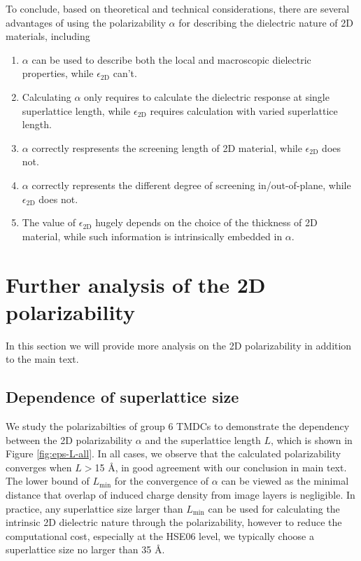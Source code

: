 \documentclass[manuscript=suppinfo,email=true,hyperref=true,keywords=false]{achemso}
\begin{document}
To conclude, based on theoretical and technical considerations, there are several
advantages of using the polarizability $\alpha$ for describing the dielectric
nature of 2D materials, including
\begin{enumerate}
\item $\alpha$ can be used to describe both the local and macroscopic dielectric properties, while $\epsilon_{\mathrm{2D}}$ can't.
\item Calculating $\alpha$ only requires to calculate the dielectric response at single superlattice length, while $\epsilon_{\mathrm{2D}}$ requires calculation with varied superlattice length.
\item $\alpha$ correctly respresents the screening length of 2D material, while $\epsilon_{\mathrm{2D}}$ does not.
\item $\alpha$ correctly represents the different degree of screening in/out-of-plane, while $\epsilon_{\mathrm{2D}}$ does not.
  
\item The value of $\epsilon_{\mathrm{2D}}$ hugely depends on the
  choice of the thickness of 2D material, while such information is
  intrinsically embedded in $\alpha$.
\end{enumerate}





\section{Further analysis of the 2D polarizability}
\label{sec:pol-2D}

In this section we will provide more analysis on the 2D polarizability
in addition to the main text.

\subsection{Dependence of superlattice size}
\label{sec:pol-2D-1}

We study the polarizabilties of group 6 TMDCs to demonstrate the
dependency between the 2D polarizability $\alpha$ and the superlattice
length $L$, which is shown in Figure \ref{fig:eps-L-all}.  In all cases, we observe that the calculated
polarizability converges when $L>$15 \AA{}, in good agreement with our
conclusion in main text. The lower bound of $L_{\mathrm{min}}$ for the
convergence of $\alpha$ can be viewed as the minimal distance that
overlap of induced charge density from image layers is negligible. In
practice, any superlattice size larger than $L_{\mathrm{min}}$ can be
used for calculating the intrinsic 2D dielectric nature through the
polarizability, however to reduce the computational cost, especially
at the HSE06 level, we typically choose a superlattice size no larger
than 35 \AA{}.
\end{document}

